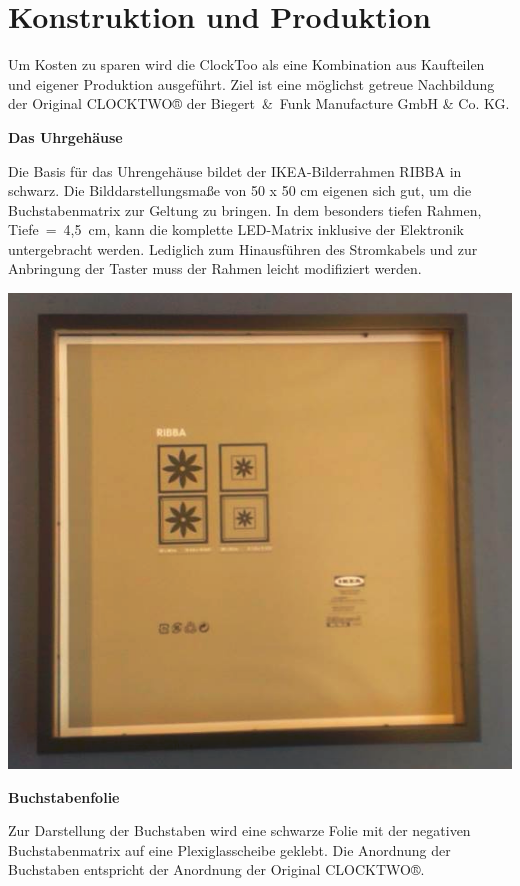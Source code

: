 
\section{Konstruktion und Produktion}
\label{sec:KonstruktionFertigung}

\begin{multicols}{2}
Um Kosten zu sparen wird die ClockToo als eine Kombination aus Kaufteilen und eigener Produktion ausgeführt. Ziel ist eine möglichst getreue Nachbildung der Original CLOCKTWO® der Biegert~\&~Funk Manufacture GmbH \& Co. KG. 

\textbf{Das Uhrgehäuse}

Die Basis für das Uhrengehäuse bildet der IKEA-Bilderrahmen RIBBA in schwarz. Die Bilddarstellungsmaße von 50 x 50 cm eigenen sich gut, um die Buchstabenmatrix zur Geltung zu bringen. In dem besonders tiefen Rahmen,  Tiefe~=~4,5~cm, kann die komplette LED-Matrix inklusive der Elektronik untergebracht werden. Lediglich zum Hinausführen des Stromkabels und zur Anbringung der Taster muss der Rahmen leicht modifiziert werden. 

{
\centering \includegraphics[width=0.85\columnwidth]{Abbildungen/Konstruktion/Ribba} %

}
\textbf{Buchstabenfolie}


Zur Darstellung der Buchstaben wird eine schwarze Folie mit der negativen Buchstabenmatrix auf eine Plexiglasscheibe geklebt. Die Anordnung der Buchstaben entspricht der Anordnung der Original CLOCKTWO®. 


\end{multicols}
